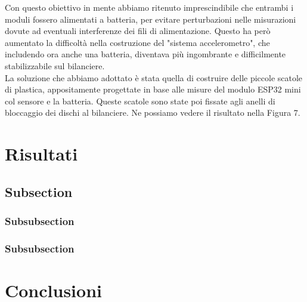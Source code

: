 \documentclass[fleqn,10pt]{SelfArx} %
\begin{document}
Con questo obiettivo in mente abbiamo ritenuto imprescindibile che entrambi i moduli fossero alimentati a batteria, 
per evitare perturbazioni nelle misurazioni dovute ad eventuali interferenze dei fili di alimentazione. Questo ha però 
aumentato la difficoltà nella costruzione del "sistema accelerometro", che includendo ora anche una batteria, 
diventava più ingombrante e difficilmente stabilizzabile sul bilanciere.\\

La soluzione che abbiamo adottato è stata quella di costruire delle piccole scatole di plastica, appositamente 
progettate in base alle misure del modulo ESP32 mini col sensore e la batteria. Queste scatole sono state poi fissate 
agli anelli di bloccaggio dei dischi al bilanciere. Ne possiamo vedere il risultato nella Figura 7.


\section{Risultati}

\subsection{Subsection}


\subsubsection{Subsubsection}

\subsubsection{Subsubsection}

\section{Conclusioni}





\end{document}
